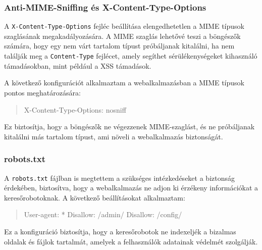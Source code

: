 \subsubsection{Anti-MIME-Sniffing és X-Content-Type-Options}

A \texttt{X-Content-Type-Options} fejléc beállítása elengedhetetlen a MIME típusok szaglásának megakadályozására. A MIME szaglás lehetővé teszi a böngészők számára, hogy egy nem várt tartalom típust próbáljanak kitalálni, ha nem találják meg a \texttt{Content-Type} fejlécet, amely segíthet sérülékenységeket kihasználó támadásokban, mint például a XSS támadások.

A következő konfigurációt alkalmaztam a webalkalmazásban a MIME típusok pontos meghatározására:

\begin{quote}
X-Content-Type-Options: nosniff
\end{quote}

Ez biztosítja, hogy a böngészők ne végezzenek MIME-szaglást, és ne próbáljanak kitalálni más tartalom típust, ami növeli a webalkalmazás biztonságát.

\subsubsection{robots.txt}

A \texttt{robots.txt} fájlban is megtettem a szükséges intézkedéseket a biztonság érdekében, biztosítva, hogy a webalkalmazás ne adjon ki érzékeny információkat a keresőrobotoknak. A következő beállításokat alkalmaztam:

\begin{quote}
User-agent: *
Disallow: /admin/
Disallow: /config/
\end{quote}

Ez a konfiguráció biztosítja, hogy a keresőrobotok ne indexeljék a bizalmas oldalak és fájlok tartalmát, amelyek a felhasználók adatainak védelmét szolgálják.